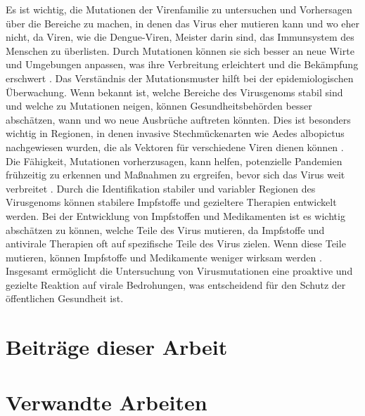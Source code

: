 \documentclass[german,version-2022-01]{uzl-thesis}
\begin{document}
Es ist wichtig, die Mutationen der Virenfamilie zu untersuchen und Vorhersagen \"uber die Bereiche zu machen, in denen das Virus eher mutieren kann und wo eher nicht, da Viren, wie die Dengue-Viren, Meister darin sind, das Immunsystem des Menschen zu \"uberlisten. Durch Mutationen k\"onnen sie sich besser an neue Wirte und Umgebungen anpassen, was ihre Verbreitung erleichtert und die Bek\"ampfung erschwert \cite{cramer_dengue-virus_2014}\cite{janisch_klein_2017}. Das Verst\"andnis der Mutationsmuster hilft bei der epidemiologischen \"Uberwachung. Wenn bekannt ist, welche Bereiche des Virusgenoms stabil sind und welche zu Mutationen neigen, k\"onnen Gesundheitsbeh\"orden besser absch\"atzen, wann und wo neue Ausbr\"uche auftreten k\"onnten. Dies ist besonders wichtig in Regionen, in denen invasive Stechm\"uckenarten wie Aedes albopictus nachgewiesen wurden, die als Vektoren f\"ur verschiedene Viren dienen k\"onnen \cite{cramer_dengue-virus_2014}. Die F\"ahigkeit, Mutationen vorherzusagen, kann helfen, potenzielle Pandemien fr\"uhzeitig zu erkennen und Ma\ss{}nahmen zu ergreifen, bevor sich das Virus weit verbreitet \cite{janisch_klein_2017}. Durch die Identifikation stabiler und variabler Regionen des Virusgenoms k\"onnen stabilere Impfstoffe und gezieltere Therapien entwickelt werden. Bei der Entwicklung von Impfstoffen und Medikamenten ist es wichtig absch\"atzen zu k\"onnen, welche Teile des Virus mutieren, da Impfstoffe und antivirale Therapien oft auf spezifische Teile des Virus zielen. Wenn diese Teile mutieren, k\"onnen Impfstoffe und Medikamente weniger wirksam werden \cite{janisch_klein_2017}. 
Insgesamt erm\"oglicht die Untersuchung von Virusmutationen eine proaktive und gezielte Reaktion auf virale Bedrohungen, was entscheidend f\"ur den Schutz der \"offentlichen Gesundheit ist.

\section{Beitr\"age dieser Arbeit}

%


\section{Verwandte Arbeiten}
\end{document}
